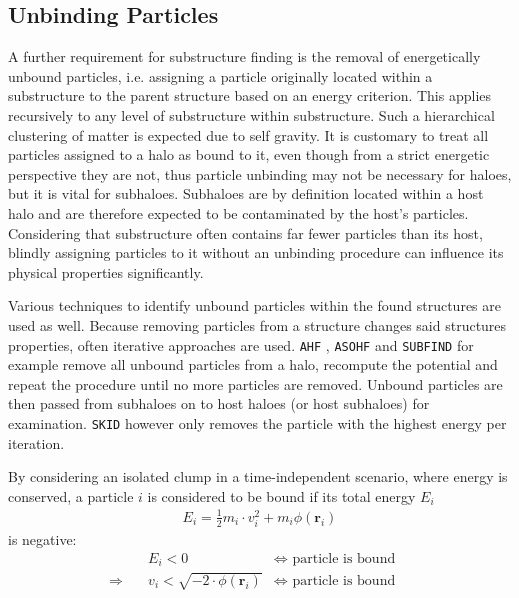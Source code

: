 \subsection{Unbinding Particles}\label{chap:unbinding}


A further requirement for substructure finding is the removal of energetically unbound particles, i.e. assigning a particle originally located within a substructure to the parent structure based on an energy criterion. 
This applies recursively to any level of substructure within substructure. 
Such a hierarchical clustering of matter is expected due to self gravity.
It is customary to treat all particles assigned to a halo as bound to it, even though from a strict energetic perspective they are not, thus particle unbinding may not be necessary for haloes, but it is vital for subhaloes. 
Subhaloes are by definition located within a host halo and are therefore expected to be contaminated by the host's particles.
Considering that substructure often contains far fewer particles than its host, blindly assigning particles to it without an unbinding procedure can influence its physical properties significantly. 


Various techniques to identify unbound particles within the found structures are used as well.
Because removing particles from a structure changes said structures properties, often iterative approaches are used.
\texttt{AHF} \parencite{AHF}, \texttt{ASOHF} \parencite{ASOHF} and \texttt{SUBFIND} \parencite{subfind} for example remove all unbound particles from a halo, recompute the potential and repeat the procedure until no more particles are removed.
Unbound particles are then passed from subhaloes on to host haloes (or host subhaloes) for examination.
\texttt{SKID} \parencite{skid} however only removes the particle with the highest energy per iteration.










By considering an isolated clump in a time-independent scenario, where energy is conserved, a particle $i$ is considered to be bound if its total energy $E_i$
%
\begin{align}
	E_i = \frac{1}{2} m_i \cdot v^2_i + m_i \phi (\mathbf{r}_i)\label{eq:E}
\end{align}
%
is negative:
\begin{align}
	& E_i < 0 &\Leftrightarrow \text{ particle is bound } &\\
	\Rightarrow \quad & 	v_i < \sqrt{- 2 \cdot \phi(\mathbf{r}_i)} &\Leftrightarrow \text{ particle is bound }\label{eq:boundv}
\end{align}

